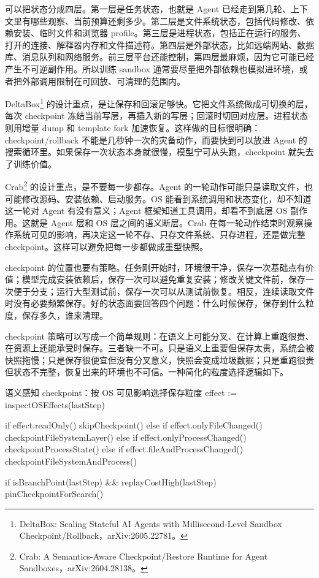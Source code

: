 可以把状态分成四层。第一层是任务状态，也就是 Agent 已经走到第几轮、上下文里有哪些观察、当前预算还剩多少。第二层是文件系统状态，包括代码修改、依赖安装、临时文件和浏览器 profile。第三层是进程状态，包括正在运行的服务、打开的连接、解释器内存和文件描述符。第四层是外部状态，比如远端网站、数据库、消息队列和网络服务。前三层平台还能控制，第四层最麻烦，因为它可能已经产生不可逆副作用。所以训练 sandbox 通常要尽量把外部依赖也模拟进环境，或者把外部调用限制在可回放、可清理的范围内。

DeltaBox\footnote{DeltaBox: Scaling Stateful AI Agents with Millisecond-Level Sandbox Checkpoint/Rollback，arXiv:2605.22781。} 的设计重点，是让保存和回滚足够快。它把文件系统做成可切换的层，每次 checkpoint 冻结当前写层，再插入新的写层；回滚时切回对应层。进程状态则用增量 dump 和 template fork 加速恢复。这样做的目标很明确：checkpoint/rollback 不能是几秒钟一次的灾备动作，而要快到可以放进 Agent 的搜索循环里。如果保存一次状态本身就很慢，模型宁可从头跑，checkpoint 就失去了训练价值。

Crab\footnote{Crab: A Semantics-Aware Checkpoint/Restore Runtime for Agent Sandboxes，arXiv:2604.28138。} 的设计重点，是不要每一步都存。Agent 的一轮动作可能只是读取文件，也可能修改源码、安装依赖、启动服务。OS 能看到系统调用和状态变化，却不知道这一轮对 Agent 有没有意义；Agent 框架知道工具调用，却看不到底层 OS 副作用。这就是 Agent 层和 OS 层之间的语义断层。Crab 在每一轮动作结束时观察操作系统可见的影响，再决定这一轮不存、只存文件系统、只存进程，还是做完整 checkpoint。这样可以避免把每一步都做成重型快照。

checkpoint 的位置也要有策略。任务刚开始时，环境很干净，保存一次基础点有价值；模型完成安装依赖后，保存一次可以避免重复安装；修改关键文件前，保存一次便于分支；运行大型测试前，保存一次可以从测试前恢复。相反，连续读取文件时没有必要频繁保存。好的状态面要回答四个问题：什么时候保存，保存到什么粒度，保存多久，谁来清理。

checkpoint 策略可以写成一个简单规则：在语义上可能分叉、在计算上重跑很贵、在资源上还能承受时保存。三者缺一不可。只是语义上重要但保存太贵，系统会被快照拖慢；只是保存很便宜但没有分叉意义，快照会变成垃圾数据；只是重跑很贵但状态不完整，恢复出来的环境也不可信。一种简化的粒度选择逻辑如下。

\begin{pseudocodebox}{语义感知 checkpoint：按 OS 可见影响选择保存粒度}
effect := inspectOSEffects(lastStep)

if effect.readOnly() {
    skipCheckpoint()
} else if effect.onlyFileChanged() {
    checkpointFileSystemLayer()
} else if effect.onlyProcessChanged() {
    checkpointProcessState()
} else if effect.fileAndProcessChanged() {
    checkpointFileSystemAndProcess()
}

if isBranchPoint(lastStep) && replayCostHigh(lastStep) {
    pinCheckpointForSearch()
}
\end{pseudocodebox}

